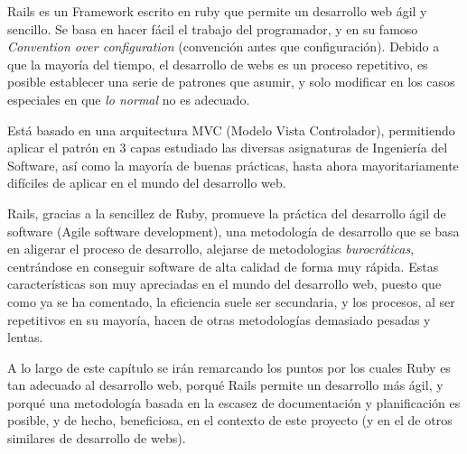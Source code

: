Rails es un Framework escrito en ruby que permite un desarrollo web ágil y sencillo. Se basa en hacer fácil el trabajo del programador, y en su famoso \emph{Convention over configuration} (convención antes que configuración). Debido a que la mayoría del tiempo, el desarrollo de webs es un proceso repetitivo, es posible establecer una serie de patrones que asumir, y solo modificar en los casos especiales en que \emph{lo normal} no es adecuado.

Está basado en una arquitectura MVC (Modelo Vista Controlador), permitiendo aplicar el patrón en 3 capas estudiado las diversas asignaturas de Ingeniería del Software, así como la mayoría de buenas prácticas, hasta ahora mayoritariamente difíciles de aplicar en el mundo del desarrollo web.

Rails, gracias a la sencillez de Ruby, promueve la práctica del desarrollo ágil de software (Agile software development), una metodología de desarrollo que se basa en aligerar el proceso de desarrollo, alejarse de metodologias \emph{burocráticas}, centrándose en conseguir software de alta calidad de forma muy rápida. Estas características son muy apreciadas en el mundo del desarrollo web, puesto que como ya se ha comentado, la eficiencia suele ser secundaria, y los procesos, al ser repetitivos en su mayoría, hacen de otras metodologías demasiado pesadas y lentas.

A lo largo de este capítulo se irán remarcando los puntos por los cuales Ruby es tan adecuado al desarrollo web, porqué Rails permite un desarrollo más ágil, y porqué una metodología basada en la escasez de documentación y planificación es posible, y de hecho, beneficiosa, en el contexto de este proyecto (y en el de otros similares de desarrollo de webs). 

